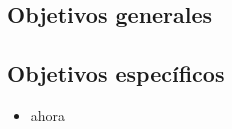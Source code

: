 
\subsection{Objetivos generales}

\subsection{Objetivos específicos}

\begin{itemize}
  \item ahora
\end{itemize}

